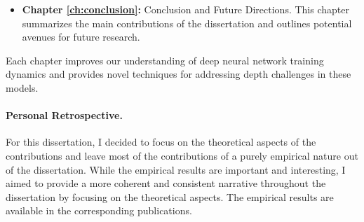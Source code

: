\begin{itemize}
    \item \textbf{Chapter \ref{ch:conclusion}:} Conclusion and Future Directions. This chapter summarizes the main contributions of the dissertation and outlines potential avenues for future research.
\end{itemize}

Each chapter improves our understanding of deep neural network training dynamics and provides novel techniques for addressing depth challenges in these models.

\paragraph{Personal Retrospective.} For this dissertation, I decided to focus on the theoretical aspects of the contributions and leave most of the contributions of a purely empirical nature out of the dissertation. While the empirical results are important and interesting, I aimed to provide a more coherent and consistent narrative throughout the dissertation by focusing on the theoretical aspects. The empirical results are available in the corresponding publications.


    
    
    

